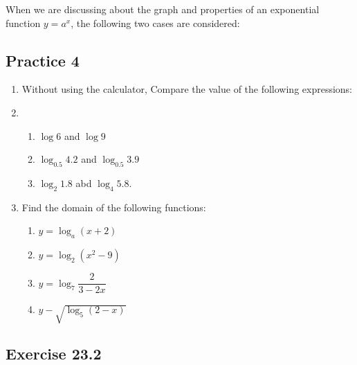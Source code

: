 \documentclass[12pt]{report}
\begin{document}
When we are discussing about the graph and properties of an exponential
function $y = a^x$, the following two cases are considered: \newpage

\subsection*{Practice 4}

\setlength{\columnseprule}{1pt}
\setlength{\columnsep}{24pt}

\begin{multicols}{2}
  \begin{enumerate}
    \item Without using the calculator, Compare the value of the following expressions:
    \item \begin{enumerate}
            \item $\log 6$ and $\log 9$
            \item $\log_{0.5} 4.2$ and $\log_{0.5} 3.9$
            \item $\log_2 1.8$ abd $\log_4 5.8$.
          \end{enumerate}
    \item Find the domain of the following functions:
          \begin{enumerate}
            \item $y = \log_a(x+2)$
            \item $y = \log_2(x^2 - 9)$
            \item $y = \log_7\dfrac{2}{3-2x}$
            \item $y - \sqrt{\log_5(2-x)}$
          \end{enumerate}
  \end{enumerate}
\end{multicols}

\subsection*{Exercise 23.2}

\setlength{\columnseprule}{1pt}
\setlength{\columnsep}{24pt}
\end{document}
